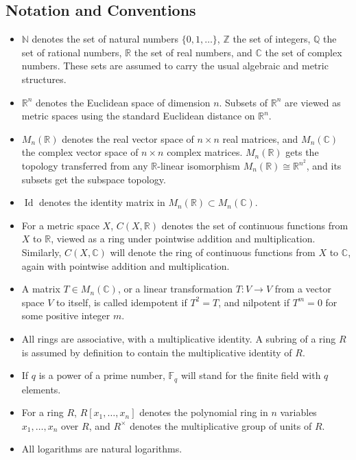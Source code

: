 \documentclass[11pt, a4paper]{article}
\begin{document}
\subsection*{Notation and Conventions}
\begin{itemize}
  \item $\mathbb{N}$ denotes the set of natural numbers $\{0, 1, \dots\}$, $\mathbb{Z}$ the set of integers, $\mathbb{Q}$ the set of rational numbers, $\mathbb{R}$ the set of real numbers, and $\mathbb{C}$ the set of complex numbers. These sets are assumed to carry the usual algebraic and metric structures.
  \item $\mathbb{R}^n$ denotes the Euclidean space of dimension $n$. Subsets of $\mathbb{R}^n$ are viewed as metric spaces using the standard Euclidean distance on $\mathbb{R}^n$.
  \item $M_n(\mathbb{R})$ denotes the real vector space of $n \times n$ real matrices, and $M_n(\mathbb{C})$ the complex vector space of $n \times n$ complex matrices. $M_n(\mathbb{R})$ gets the topology transferred from any $\mathbb{R}$-linear isomorphism $M_n(\mathbb{R}) \cong \mathbb{R}^{n^2}$, and its subsets get the subspace topology.
  \item $\operatorname{Id}$ denotes the identity matrix in $M_n(\mathbb{R}) \subset M_n(\mathbb{C})$.
  \item For a metric space $X$, $C(X, \mathbb{R})$ denotes the set of continuous functions from $X$ to $\mathbb{R}$, viewed as a ring under pointwise addition and multiplication. Similarly, $C(X, \mathbb{C})$ will denote the ring of continuous functions from $X$ to $\mathbb{C}$, again with pointwise addition and multiplication.
  \item A matrix $T \in M_n(\mathbb{C})$, or a linear transformation $T: V \to V$ from a vector space $V$ to itself, is called idempotent if $T^2 = T$, and nilpotent if $T^m = 0$ for some positive integer $m$.
  \item All rings are associative, with a multiplicative identity. A subring of a ring $R$ is assumed by definition to contain the multiplicative identity of $R$.
  \item If $q$ is a power of a prime number, $\mathbb{F}_q$ will stand for the finite field with $q$ elements.
  \item For a ring $R$, $R[x_1, \dots, x_n]$ denotes the polynomial ring in $n$ variables $x_1, \dots, x_n$ over $R$, and $R^\times$ denotes the multiplicative group of units of $R$.
  \item All logarithms are natural logarithms.

\end{itemize}
\end{document}
